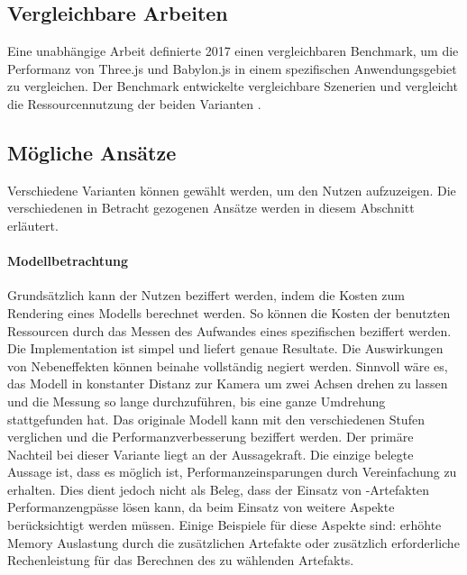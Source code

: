 \subsection{Vergleichbare Arbeiten}
Eine unabhängige Arbeit definierte 2017 einen vergleichbaren Benchmark, um die Performanz von Three.js und Babylon.js in einem spezifischen Anwendungsgebiet zu vergleichen. Der Benchmark entwickelte vergleichbare Szenerien und vergleicht die Ressourcennutzung der beiden Varianten \cite{performanceComparisonBabylonThreejs}.

\subsection{Mögliche Ansätze}

Verschiedene Varianten können gewählt werden, um den Nutzen aufzuzeigen. Die verschiedenen in Betracht gezogenen Ansätze werden in diesem Abschnitt erläutert.

\paragraph{Modellbetrachtung}
Grundsätzlich kann der Nutzen beziffert werden, indem die Kosten zum Rendering eines Modells berechnet werden. So können die Kosten der benutzten  Ressourcen durch das Messen des Aufwandes eines spezifischen  beziffert werden. Die Implementation ist simpel und liefert genaue Resultate. Die Auswirkungen von Nebeneffekten können beinahe vollständig negiert werden.
Sinnvoll wäre es, das Modell in konstanter Distanz zur Kamera um zwei Achsen drehen zu lassen und die Messung so lange durchzuführen, bis eine ganze Umdrehung stattgefunden hat. Das originale Modell kann mit den verschiedenen Stufen verglichen und die Performanzverbesserung beziffert werden.
Der primäre Nachteil bei dieser Variante liegt an der Aussagekraft. Die einzige belegte Aussage ist, dass es möglich ist, Performanzeinsparungen durch Vereinfachung zu erhalten. Dies dient jedoch nicht als Beleg, dass der Einsatz von -Artefakten Performanzengpässe lösen kann, da beim Einsatz von  weitere Aspekte berücksichtigt werden müssen. Einige Beispiele für diese Aspekte sind: erhöhte Memory Auslastung durch die zusätzlichen Artefakte oder zusätzlich erforderliche Rechenleistung für das Berechnen des zu wählenden Artefakts.

